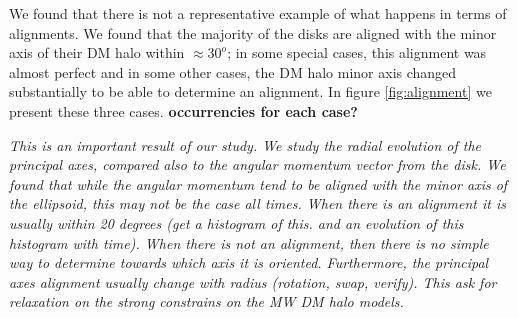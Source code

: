 \documentclass[a4paper,fleqn,usenatbib]{mnras}
\begin{document}
We found that there is not a representative example of what happens in
terms of alignments. We found that the majority of the disks are
aligned with the minor axis of their DM halo within $\approx 30^o$; in
some special cases, this alignment was almost perfect and in some
other cases, the DM halo minor axis changed substantially to be able
to determine an alignment. In figure \ref{fig:alignment} we present
these three cases. \textbf{occurrencies for each case?} 


\textit{This is an important result of our study. We study the radial
  evolution of the principal axes, compared also to the angular
  momentum vector from the disk. We found that while the angular
  momentum tend to be aligned with the minor axis of the ellipsoid,
  this may not be the case all times. When there is an alignment it is
  usually within 20 degrees (get a histogram of this. and an evolution
  of this histogram with time). When there is not an alignment, then
  there is no simple way to determine towards which axis it is
  oriented. Furthermore, the principal axes alignment usually change
  with radius (rotation, swap, verify). This ask for relaxation on the
  strong constrains on the MW DM halo models.} 
\end{document}
